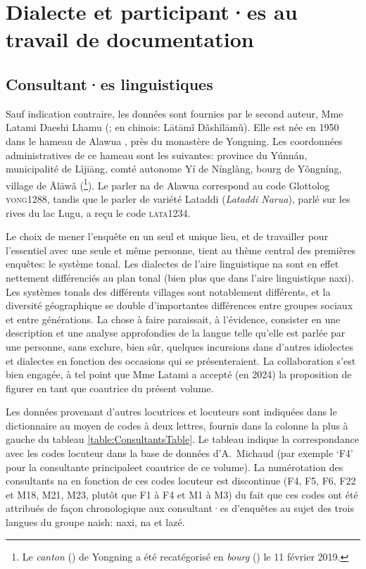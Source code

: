 \section{Dialecte et participant·es au travail de documentation}
\label{sec:dialect}

\subsection{Consultant·es linguistiques}

Sauf indication contraire, les données sont fournies par le second auteur, Mme Latami Daeshi Lhamu (; en chinois:  Lātāmǐ Dǎshǐlāmǔ). Elle est née en 1950 dans le hameau de Alawua , près du monastère de Yongning. Les coordonnées administratives de ce hameau sont les suivantes: province du Yúnnán, municipalité de Lìjiāng, comté autonome Yí de Nínglàng, bourg de Yǒngníng, village de Ālāwǎ (\footnote{Le \emph{canton} () de Yongning a été recatégorisé en \emph{bourg} () le 11 février 2019.}). Le parler na de Alawua correspond au code Glottolog \textsc{yong1288}, tandis que le parler de variété Lataddi (\emph{Lataddi Narua}), parlé sur les rives du lac Lugu, a reçu le code \textsc{lata1234}.

Le choix de mener l'enquête en un seul et unique lieu, et de travailler pour l'essentiel avec une seule et même personne, tient au thème central des premières enquêtes: le système tonal. Les dialectes de l'aire linguistique na sont en effet nettement différenciés au plan tonal (bien plus que dans l'aire linguistique naxi). Les systèmes tonals des différents villages sont notablement différents, et la diversité géographique se double d'importantes différences entre groupes sociaux et entre générations. La chose à faire paraissait, à l'évidence, consister en une description et une analyse approfondies de la langue telle qu'elle est parlée par une personne, sans exclure, bien sûr, quelques incursions dans d'autres idiolectes et dialectes en fonction des occasions qui se présenteraient. La collaboration s'est bien engagée, à tel point que Mme Latami a accepté (en 2024) la proposition de figurer en tant que coautrice du présent volume.

Les données provenant d'autres locutrices et locuteurs sont indiquées dans le dictionnaire au moyen de codes à deux lettres, fournis dans la colonne la plus à gauche du tableau \ref{table:ConsultantsTable}. Le tableau indique la correspondance avec les codes locuteur dans la base de données d'A.\ Michaud (par exemple `F4' pour la consultante principaleet coautrice de ce volume). La numérotation des consultants na en fonction de ces codes locuteur est discontinue (F4, F5, F6, F22 et M18, M21, M23, plutôt que F1 à F4 et M1 à M3) du fait que ces codes ont été attribués de façon chronologique aux consultant·es d'enquêtes au sujet des trois langues du groupe naish: naxi, na et lazé.

